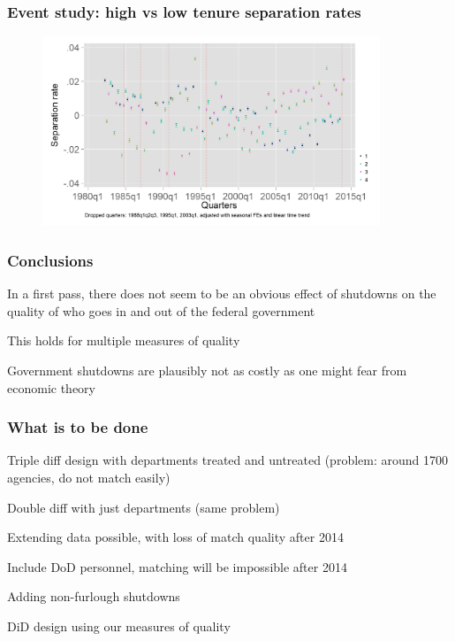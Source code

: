 \documentclass[aspectratio=169]{beamer}
\newenvironment{wideitemize}{\itemize\addtolength{\itemsep}{10pt}}{\enditemize}
\begin{document}
\begin{frame}
    \frametitle{Event study: high vs low tenure separation rates}

    \begin{figure}[]
        \centering
        \includegraphics[width=0.9\textwidth]{../output/separation_rate_med_los.png}
    \end{figure}

\end{frame}

\begin{frame}
    \frametitle{Conclusions}

    \begin{wideitemize}
        \item In a first pass, there does not seem to be an obvious effect of shutdowns on the quality of who goes in and out of the federal government
        \item This holds for multiple measures of quality
        \item Government shutdowns are plausibly not as costly as one might fear from economic theory
    \end{wideitemize}
    
\end{frame}

\begin{frame}
    \frametitle{What is to be done}

    \begin{wideitemize}
        \item Triple diff design with departments treated and untreated (problem: around 1700 agencies, do not match easily)
        \item Double diff with just departments (same problem)
        \item Extending data possible, with loss of match quality after 2014
        \item Include DoD personnel, matching will be impossible after 2014
        \item Adding non-furlough shutdowns
        \item DiD design using our measures of quality
    \end{wideitemize}

\end{frame}
\end{document}
